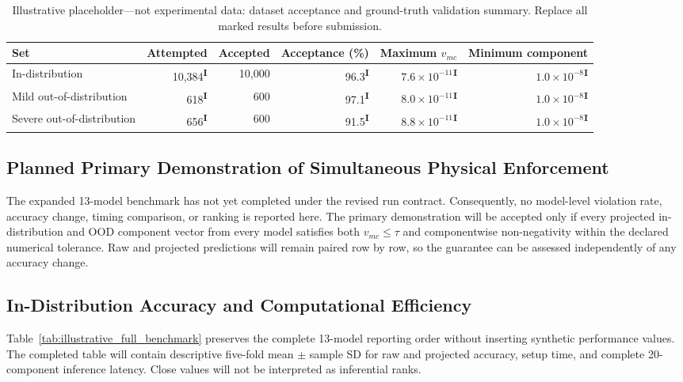 \documentclass[a4paper,fleqn]{cas-sc}
\newcommand{\illustrative}{\textsuperscript{\textcolor{CoralRust}{\textbf{I}}}}
\begin{document}
\begin{table}[htbp]
\centering
\caption{Illustrative placeholder---not experimental data: dataset acceptance and ground-truth validation summary. Replace all marked results before submission.}
\label{tab:illustrative_dataset_validation}
\scriptsize
\begin{tabular}{lrrrrr}
\toprule
Set & Attempted & Accepted & Acceptance (\%) & Maximum $v_{mc}$ & Minimum component \\
\midrule
In-distribution & 10,384\illustrative & 10,000 & 96.3\illustrative & $7.6\times10^{-11}$\illustrative & $1.0\times10^{-8}$\illustrative \\
Mild out-of-distribution & 618\illustrative & 600 & 97.1\illustrative & $8.0\times10^{-11}$\illustrative & $1.0\times10^{-8}$\illustrative \\
Severe out-of-distribution & 656\illustrative & 600 & 91.5\illustrative & $8.8\times10^{-11}$\illustrative & $1.0\times10^{-8}$\illustrative \\
\bottomrule
\end{tabular}
\end{table}

\subsection{Planned Primary Demonstration of Simultaneous Physical Enforcement}

The expanded 13-model benchmark has not yet completed under the revised run contract. Consequently, no model-level violation rate, accuracy change, timing comparison, or ranking is reported here. The primary demonstration will be accepted only if every projected in-distribution and OOD component vector from every model satisfies both $v_{mc}\leq\tau$ and componentwise non-negativity within the declared numerical tolerance. Raw and projected predictions will remain paired row by row, so the guarantee can be assessed independently of any accuracy change.

\subsection{In-Distribution Accuracy and Computational Efficiency}

Table~\ref{tab:illustrative_full_benchmark} preserves the complete 13-model reporting order without inserting synthetic performance values. The completed table will contain descriptive five-fold mean $\pm$ sample SD for raw and projected accuracy, setup time, and complete 20-component inference latency. Close values will not be interpreted as inferential ranks.
\end{document}
